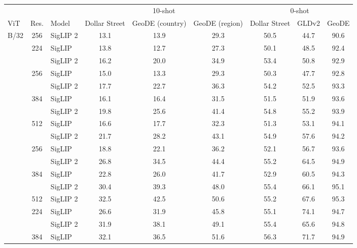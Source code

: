 \setlength{\tabcolsep}{0.6em}
\begin{tabular}{lclcccccc}
\toprule
 &  &  & \multicolumn{3}{c}{10-shot} & \multicolumn{3}{c}{0-shot} \\
 \cmidrule(lr){4-6} \cmidrule(lr){7-9}
ViT & Res. & Model & Dollar Street & GeoDE (country) & GeoDE (region) & Dollar Street & GLDv2 & GeoDE \\
\midrule
B/32 & 256 & SigLIP 2 & 13.1 & 13.9 & 29.3 & 50.5 & 44.7 & 90.6 \\
\arrayrulecolor{black}\cline{1-9}
\multirow[c]{8}{*}{B/16} & \multirow[c]{2}{*}{224} & SigLIP & 13.8 & 12.7 & 27.3 & 50.1 & 48.5 & 92.4 \\
 &  & SigLIP 2 & 16.2 & 20.0 & 34.9 & 53.4 & 50.8 & 92.9 \\
\arrayrulecolor{lightgray}\cline{2-9}
 & \multirow[c]{2}{*}{256} & SigLIP & 15.0 & 13.3 & 29.3 & 50.3 & 47.7 & 92.8 \\
 &  & SigLIP 2 & 17.7 & 22.7 & 36.3 & 54.2 & 52.5 & 93.3 \\
\arrayrulecolor{lightgray}\cline{2-9}
 & \multirow[c]{2}{*}{384} & SigLIP & 16.1 & 16.4 & 31.5 & 51.5 & 51.9 & 93.6 \\
 &  & SigLIP 2 & 19.8 & 25.6 & 41.4 & 54.8 & 55.2 & 93.9 \\
\arrayrulecolor{lightgray}\cline{2-9}
 & \multirow[c]{2}{*}{512} & SigLIP & 16.6 & 17.7 & 32.3 & 51.3 & 53.1 & 94.1 \\
 &  & SigLIP 2 & 21.7 & 28.2 & 43.1 & 54.9 & 57.6 & 94.2 \\
\arrayrulecolor{black}\cline{1-9} 
\multirow[c]{5}{*}{L/16} & \multirow[c]{2}{*}{256} & SigLIP & 18.8 & 22.1 & 36.2 & 52.1 & 56.7 & 93.6 \\
 &  & SigLIP 2 & 26.8 & 34.5 & 44.4 & 55.2 & 64.5 & 94.9 \\
\arrayrulecolor{lightgray}\cline{2-9}
 & \multirow[c]{2}{*}{384} & SigLIP & 22.8 & 26.0 & 41.7 & 52.9 & 60.5 & 94.3 \\
 &  & SigLIP 2 & 30.4 & 39.3 & 48.0 & 55.4 & 66.1 & 95.1 \\
\arrayrulecolor{lightgray}\cline{2-9}
 & 512 & SigLIP 2 & 32.5 & 42.5 & 50.6 & 55.2 & 67.6 & 95.3 \\
\arrayrulecolor{black}\cline{1-9} 
\multirow[c]{4}{*}{So400m/14} & \multirow[c]{2}{*}{224} & SigLIP & 26.6 & 31.9 & 45.8 & 55.1 & 74.1 & 94.7 \\
 &  & SigLIP 2 & 31.9 & 38.1 & 49.1 & 55.4 & 65.6 & 94.8 \\
\arrayrulecolor{lightgray}\cline{2-9}
 & \multirow[c]{2}{*}{384} & SigLIP & 32.1 & 36.5 & 51.6 & 56.3 & 71.7 & 94.9 \\

\end{tabular}
